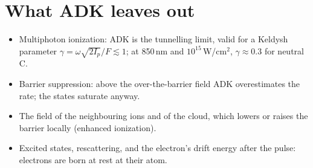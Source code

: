 \section{What ADK leaves out}

\begin{itemize}
  \item Multiphoton ionization: ADK is the tunnelling limit, valid for a Keldysh parameter
    $\gamma = \omega\sqrt{2I_p}/F\lesssim1$; at 850\,nm and $10^{15}$\,W/cm$^2$, $\gamma\approx0.3$ for neutral C.
  \item Barrier suppression: above the over-the-barrier field ADK overestimates the rate; the states saturate anyway.
  \item The field of the neighbouring ions and of the cloud, which lowers or raises the barrier locally
    (enhanced ionization).
  \item Excited states, rescattering, and the electron's drift energy after the pulse: electrons are born at rest
    at their atom.
\end{itemize}

